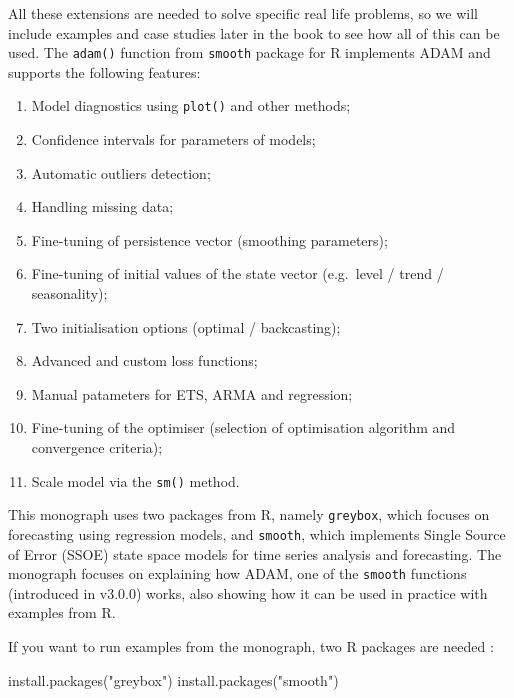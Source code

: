 \documentclass[
]{book}
\newenvironment{Shaded}{\begin{snugshade}}{\end{snugshade}}
\newcommand{\FunctionTok}[1]{\textcolor[rgb]{0.00,0.00,0.00}{#1}}
\newcommand{\NormalTok}[1]{#1}
\newcommand{\StringTok}[1]{\textcolor[rgb]{0.31,0.60,0.02}{#1}}
\providecommand{\tightlist}{%
  \setlength{\itemsep}{0pt}\setlength{\parskip}{0pt}}
\theoremstyle{definition}
\theoremstyle{definition}
\theoremstyle{definition}
\theoremstyle{definition}
\theoremstyle{remark}
\begin{document}
All these extensions are needed to solve specific real life problems, so we will include examples and case studies later in the book to see how all of this can be used. The \texttt{adam()} function from \texttt{smooth} package for R implements ADAM and supports the following features:

\begin{enumerate}
\def\labelenumi{\arabic{enumi}.}
\tightlist
\item
  Model diagnostics using \texttt{plot()} and other methods;
\item
  Confidence intervals for parameters of models;
\item
  Automatic outliers detection;
\item
  Handling missing data;
\item
  Fine-tuning of persistence vector (smoothing parameters);
\item
  Fine-tuning of initial values of the state vector (e.g.~level / trend / seasonality);
\item
  Two initialisation options (optimal / backcasting);
\item
  Advanced and custom loss functions;
\item
  Manual patameters for ETS, ARMA and regression;
\item
  Fine-tuning of the optimiser (selection of optimisation algorithm and convergence criteria);
\item
  Scale model via the \texttt{sm()} method.
\end{enumerate}

This monograph uses two packages from R, namely \texttt{greybox}, which focuses on forecasting using regression models, and \texttt{smooth}, which implements Single Source of Error (SSOE) state space models for time series analysis and forecasting. The monograph focuses on explaining how ADAM, one of the \texttt{smooth} functions (introduced in v3.0.0) works, also showing how it can be used in practice with examples from R.

If you want to run examples from the monograph, two R packages are needed \citep{R-greybox, R-smooth}:

\begin{Shaded}
\begin{Highlighting}[]
\FunctionTok{install.packages}\NormalTok{(}\StringTok{"greybox"}\NormalTok{)}
\FunctionTok{install.packages}\NormalTok{(}\StringTok{"smooth"}\NormalTok{)}
\end{Highlighting}
\end{Shaded}
\end{document}
